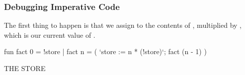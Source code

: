 \documentclass[aspectratio=169, handout]{beamer}
\begin{document}
\begin{frame}[fragile]
  \frametitle{Debugging Imperative Code}

  \begin{minipage}[t][0.6in][t]{\textwidth}
  The first thing to happen is that we assign  to the contents
  of , multiplied by , which is our current value of
  .
  \end{minipage}

  \vspace{10pt}

  \begin{center}
    \begin{minipage}[t][1.7in][t]{0.6\textwidth}
      \vspace{\fill}
      \begin{codeblock}
        fun fact 0 = !store
          | fact n =
              ( `store := n * (!store)`;
                fact (n - 1)
              )
      \end{codeblock}
      \vspace{\fill}
    \end{minipage}
    \hfill\vline\hfill
    \begin{minipage}[t][1.7in][t]{0.3\textwidth}
      \centering
      {\hspace{-20pt}\color{gray} \large THE STORE}

      \vspace{\fill}
      \vspace{\fill}
    \end{minipage}
  \end{center}
\end{frame}
\end{document}
